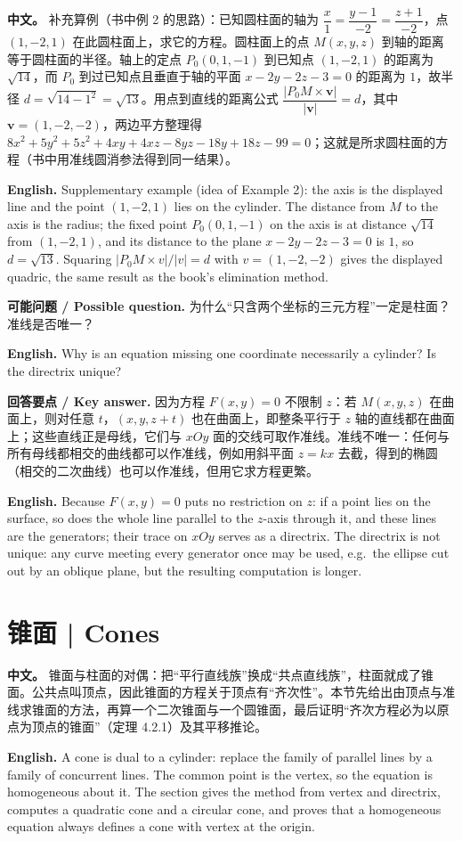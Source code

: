 \documentclass[UTF8,11pt,a4paper]{ctexart}
\newcommand{\APS}[2]{\par\noindent\textbf{中文。} #1\par\noindent\textbf{English.} #2\par\smallskip}
\newcommand{\EN}[1]{\par\noindent \textbf{English.} #1\par}
\newcommand{\ASK}[4]{\par\noindent \textbf{可能问题 / Possible question.} #1\par\EN{#2}\noindent \textbf{回答要点 / Key answer.} #3\par\EN{#4}\medskip}
\theoremstyle{definition}
\newcommand{\vv}[1]{\mathbf{#1}}
\begin{document}
\APS{补充算例（书中例 2 的思路）：已知圆柱面的轴为 $\dfrac{x}{1}=\dfrac{y-1}{-2}=\dfrac{z+1}{-2}$，点 $(1,-2,1)$ 在此圆柱面上，求它的方程。圆柱面上的点 $M(x,y,z)$ 到轴的距离等于圆柱面的半径。轴上的定点 $P_0(0,1,-1)$ 到已知点 $(1,-2,1)$ 的距离为 $\sqrt{14}$，而 $P_0$ 到过已知点且垂直于轴的平面 $x-2y-2z-3=0$ 的距离为 $1$，故半径 $d=\sqrt{14-1^2}=\sqrt{13}$。用点到直线的距离公式 $\dfrac{|P_0M\times \vv{v}|}{|\vv{v}|}=d$，其中 $\vv{v}=(1,-2,-2)$，两边平方整理得 $8x^2+5y^2+5z^2+4xy+4xz-8yz-18y+18z-99=0$；这就是所求圆柱面的方程（书中用准线圆消参法得到同一结果）。}{Supplementary example (idea of Example 2): the axis is the displayed line and the point $(1,-2,1)$ lies on the cylinder. The distance from $M$ to the axis is the radius; the fixed point $P_0(0,1,-1)$ on the axis is at distance $\sqrt{14}$ from $(1,-2,1)$, and its distance to the plane $x-2y-2z-3=0$ is $1$, so $d=\sqrt{13}$. Squaring $|P_0M\times v|/|v|=d$ with $v=(1,-2,-2)$ gives the displayed quadric, the same result as the book's elimination method.}

\ASK{为什么``只含两个坐标的三元方程''一定是柱面？准线是否唯一？}{Why is an equation missing one coordinate necessarily a cylinder? Is the directrix unique?}{因为方程 $F(x,y)=0$ 不限制 $z$：若 $M(x,y,z)$ 在曲面上，则对任意 $t$，$(x,y,z+t)$ 也在曲面上，即整条平行于 $z$ 轴的直线都在曲面上；这些直线正是母线，它们与 $xOy$ 面的交线可取作准线。准线不唯一：任何与所有母线都相交的曲线都可以作准线，例如用斜平面 $z=kx$ 去截，得到的椭圆（相交的二次曲线）也可以作准线，但用它求方程更繁。}{Because $F(x,y)=0$ puts no restriction on $z$: if a point lies on the surface, so does the whole line parallel to the $z$-axis through it, and these lines are the generators; their trace on $xOy$ serves as a directrix. The directrix is not unique: any curve meeting every generator once may be used, e.g.\ the ellipse cut out by an oblique plane, but the resulting computation is longer.}

\section{\label{sec:2}锥面 | Cones}
\APS{锥面与柱面的对偶：把``平行直线族''换成``共点直线族''，柱面就成了锥面。公共点叫顶点，因此锥面的方程关于顶点有``齐次性''。本节先给出由顶点与准线求锥面的方法，再算一个二次锥面与一个圆锥面，最后证明``齐次方程必为以原点为顶点的锥面''（定理 4.2.1）及其平移推论。}{A cone is dual to a cylinder: replace the family of parallel lines by a family of concurrent lines. The common point is the vertex, so the equation is homogeneous about it. The section gives the method from vertex and directrix, computes a quadratic cone and a circular cone, and proves that a homogeneous equation always defines a cone with vertex at the origin.}
\end{document}
